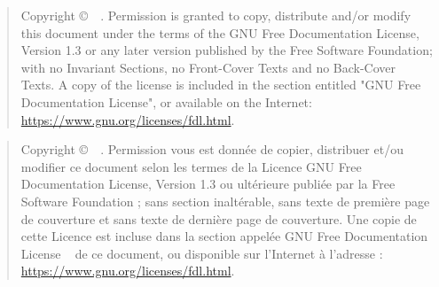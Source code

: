 \vspace*{\fill}
\begin{quote}\en
    Copyright \copyright\ \the\year\ \MAILGREGORY.  Permission is
    granted to copy, distribute and/or modify this document under the
    terms of the GNU Free Documentation License, Version 1.3 or any
    later version published by the Free Software Foundation; with no
    Invariant Sections, no Front-Cover Texts and no Back-Cover Texts.
    A copy of the license is included in the section entitled "GNU
    Free Documentation License", or available on the Internet:
    \url{https://www.gnu.org/licenses/fdl.html}.
\end{quote}
\vspace{2cm}
\begin{quote}\fr
    Copyright \copyright\ \the\year\ \MAILGREGORY.  Permission vous
    est donn\'ee de copier, distribuer et/ou modifier ce document
    selon les termes de la Licence GNU Free Documentation License,
    Version 1.3 ou ult\'erieure publi\'ee par la Free Software
    Foundation ; sans section inalt\'erable, sans texte de premi\`ere
    page de couverture et sans texte de derni\`ere page de
    couverture. Une copie de cette Licence est incluse dans la section
    appel\'ee \og GNU Free Documentation License \fg~ de ce document,
    ou disponible sur l'Internet à l'adresse :
    \url{https://www.gnu.org/licenses/fdl.html}.
\end{quote}
\vspace*{\fill}
